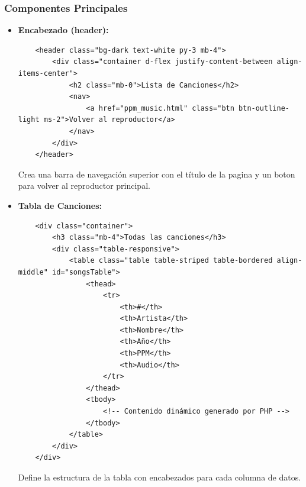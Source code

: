 \documentclass[a4paper,12pt]{article}
\begin{document}
\subsubsection{Componentes Principales}
\begin{itemize}
    \item \textbf{Encabezado (header):}
    \begin{verbatim}
    <header class="bg-dark text-white py-3 mb-4">
        <div class="container d-flex justify-content-between align-items-center">
            <h2 class="mb-0">Lista de Canciones</h2>
            <nav>
                <a href="ppm_music.html" class="btn btn-outline-light ms-2">Volver al reproductor</a>
            </nav>
        </div>
    </header>
    \end{verbatim}
    Crea una barra de navegación superior con el título de la pagina y un boton para volver al reproductor principal.

    \item \textbf{Tabla de Canciones:}
    \begin{verbatim}
    <div class="container">
        <h3 class="mb-4">Todas las canciones</h3>
        <div class="table-responsive">
            <table class="table table-striped table-bordered align-middle" id="songsTable">
                <thead>
                    <tr>
                        <th>#</th>
                        <th>Artista</th>
                        <th>Nombre</th>
                        <th>Año</th>
                        <th>PPM</th>
                        <th>Audio</th>
                    </tr>
                </thead>
                <tbody>
                    <!-- Contenido dinámico generado por PHP -->
                </tbody>
            </table>
        </div>
    </div>
    \end{verbatim}
    Define la estructura de la tabla con encabezados para cada columna de datos.
\end{itemize}
\end{document}
